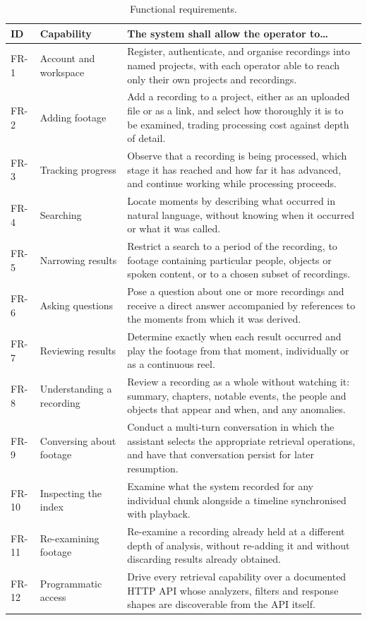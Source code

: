\documentclass[11pt,a4paper]{article}
\begin{document}
\begin{table}[htbp]
\centering
\small
\begin{tabularx}{\textwidth}{@{}lL{2.6cm}X@{}}
\toprule
\textbf{ID} & \textbf{Capability} & \textbf{The system shall allow the operator to\dots} \\
\midrule
FR-1 & Account and workspace & Register, authenticate, and organise recordings into named projects, with each operator able to reach only their own projects and recordings. \\
FR-2 & Adding footage & Add a recording to a project, either as an uploaded file or as a link, and select how thoroughly it is to be examined, trading processing cost against depth of detail. \\
FR-3 & Tracking progress & Observe that a recording is being processed, which stage it has reached and how far it has advanced, and continue working while processing proceeds. \\
FR-4 & Searching & Locate moments by describing what occurred in natural language, without knowing when it occurred or what it was called. \\
FR-5 & Narrowing results & Restrict a search to a period of the recording, to footage containing particular people, objects or spoken content, or to a chosen subset of recordings. \\
FR-6 & Asking questions & Pose a question about one or more recordings and receive a direct answer accompanied by references to the moments from which it was derived. \\
FR-7 & Reviewing results & Determine exactly when each result occurred and play the footage from that moment, individually or as a continuous reel. \\
FR-8 & Understanding a recording & Review a recording as a whole without watching it: summary, chapters, notable events, the people and objects that appear and when, and any anomalies. \\
FR-9 & Conversing about footage & Conduct a multi-turn conversation in which the assistant selects the appropriate retrieval operations, and have that conversation persist for later resumption. \\
FR-10 & Inspecting the index & Examine what the system recorded for any individual chunk alongside a timeline synchronised with playback. \\
FR-11 & Re-examining footage & Re-examine a recording already held at a different depth of analysis, without re-adding it and without discarding results already obtained. \\
FR-12 & Programmatic access & Drive every retrieval capability over a documented HTTP API whose analyzers, filters and response shapes are discoverable from the API itself. \\
\bottomrule
\end{tabularx}
\caption{Functional requirements.}
\end{table}
\end{document}
